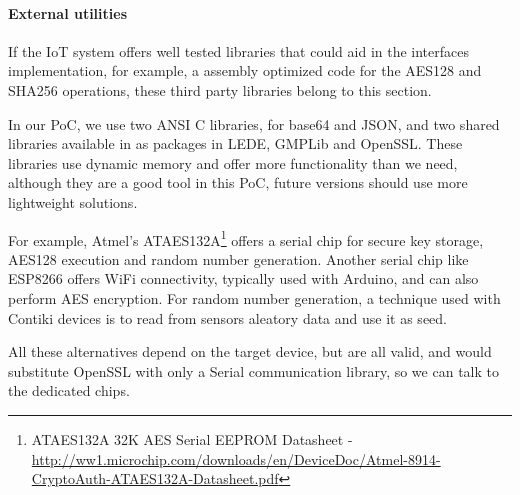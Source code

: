 \paragraph{External utilities}\hfil

If the IoT system offers well tested libraries that could aid in the interfaces implementation, for example, a assembly optimized code for the AES128 and SHA256 operations, these third party libraries belong to this section.

In our PoC, we use two ANSI C libraries, for base64 and JSON, and two shared libraries available in as packages in LEDE, GMPLib and OpenSSL. These libraries use dynamic memory and offer more functionality than we need, although they are a good tool in this PoC, future versions should use more lightweight solutions.

For example, Atmel's ATAES132A\footnote{ATAES132A 32K AES Serial EEPROM  Datasheet - \url{http://ww1.microchip.com/downloads/en/DeviceDoc/Atmel-8914-CryptoAuth-ATAES132A-Datasheet.pdf}}
offers a serial chip for secure key storage, AES128 execution and random number generation. Another serial chip like ESP8266 offers WiFi connectivity, typically used with Arduino, and can also perform AES encryption. For random number generation, a technique used with Contiki devices is to read from sensors aleatory data and use it as seed.

All these alternatives depend on the target device, but are all valid, and would substitute OpenSSL with only a Serial communication library, so we can talk to the dedicated chips.

